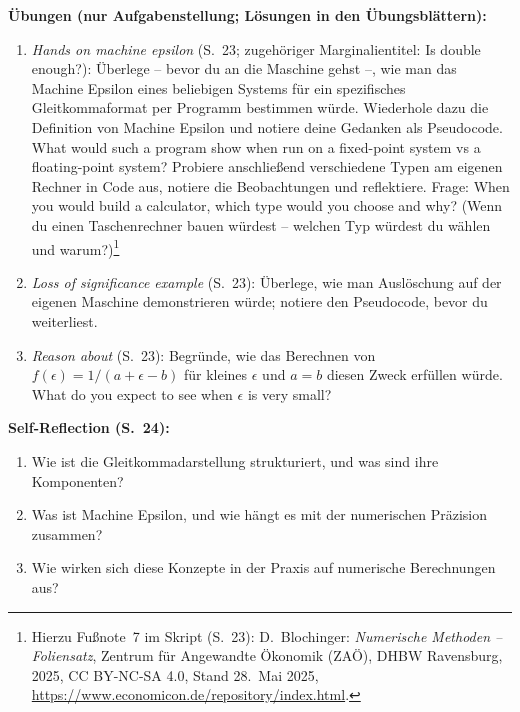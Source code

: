 \textbf{Übungen (nur Aufgabenstellung; Lösungen in den Übungsblättern):}
\begin{enumerate}[itemsep=1pt]
  \item \emph{Hands on machine epsilon} (S.~23; zugehöriger Marginalientitel: \glqq Is double enough?\grqq): Überlege -- bevor du an die Maschine gehst --, wie man das Machine Epsilon eines beliebigen Systems für ein spezifisches Gleitkommaformat per Programm bestimmen würde. Wiederhole dazu die Definition von Machine Epsilon und notiere deine Gedanken als Pseudocode. \glqq What would such a program show when run on a fixed-point system vs a floating-point system?\grqq{} Probiere anschließend verschiedene Typen am eigenen Rechner in Code aus, notiere die Beobachtungen und reflektiere. Frage: \glqq When you would build a calculator, which type would you choose and why?\grqq{} (Wenn du einen Taschenrechner bauen würdest -- welchen Typ würdest du wählen und warum?)\footnote{Hierzu Fußnote~7 im Skript (S.~23): D.~Blochinger: \emph{Numerische Methoden -- Foliensatz}, Zentrum für Angewandte Ökonomik (ZAÖ), DHBW Ravensburg, 2025, CC BY-NC-SA 4.0, Stand 28.~Mai 2025, \url{https://www.economicon.de/repository/index.html}.}
  \item \emph{Loss of significance example} (S.~23): Überlege, wie man Auslöschung auf der eigenen Maschine demonstrieren würde; notiere den Pseudocode, bevor du weiterliest.
  \item \emph{Reason about} (S.~23): Begründe, wie das Berechnen von $f(\epsilon) = 1/(a + \epsilon - b)$ für kleines $\epsilon$ und $a = b$ diesen Zweck erfüllen würde. \glqq What do you expect to see when $\epsilon$ is very small?\grqq{}
\end{enumerate}

\textbf{Self-Reflection (S.~24):}
\begin{enumerate}[itemsep=1pt]
  \item Wie ist die Gleitkommadarstellung strukturiert, und was sind ihre Komponenten?
  \item Was ist Machine Epsilon, und wie hängt es mit der numerischen Präzision zusammen?
  \item Wie wirken sich diese Konzepte in der Praxis auf numerische Berechnungen aus?
\end{enumerate}

